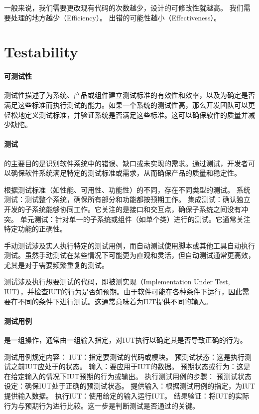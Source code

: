 一般来说，我们需要更改现有代码的次数越少，设计的可修改性就越高。
我们需要处理的地方越少（Efficiency）。
出错的可能性越小（Effectiveness）。

\section{Testability}
\paragraph{可测试性}测试性描述了为系统、产品或组件建立测试标准的有效性和效率，以及为确定是否满足这些标准而执行测试的能力。如果一个系统的测试性高，那么开发团队可以更轻松地定义测试标准，并验证系统是否满足这些标准。这可以确保软件的质量并减少缺陷。
\paragraph{测试}的主要目的是识别软件系统中的错误、缺口或未实现的需求。通过测试，开发者可以确保软件系统满足特定的测试标准或需求，从而确保产品的质量和稳定性。

根据测试标准（如性能、可用性、功能性）的不同，存在不同类型的测试。
系统测试：测试整个系统，确保所有部分和功能都按预期工作。
集成测试：确认独立开发的子系统能够协同工作。它关注的是接口和交互点，确保子系统之间没有冲突。
单元测试：针对单一的子系统或组件（如单个类）进行的测试。它通常关注特定功能的正确性。

手动测试涉及实人执行特定的测试用例，而自动测试使用脚本或其他工具自动执行测试。虽然手动测试在某些情况下可能更为直观和灵活，但自动测试通常更高效，尤其是对于需要频繁重复的测试。

测试涉及执行想要测试的代码，即被测实现（Implementation Under Test, IUT），并检查IUT的行为是否如预期。由于软件可能在各种条件下运行，因此需要在不同的条件下进行测试。这通常意味着为IUT提供不同的输入。

\paragraph{测试用例}是一组操作，通常由一组输入指定，对IUT执行以确定其是否导致正确的行为。

测试用例规定内容：
IUT：指定要测试的代码或模块。
预测试状态：这是执行测试之前IUT应处于的状态。
输入：要应用于IUT的数据。
预期状态或行为：这是在给定输入的情况下IUT预期的行为或输出。
执行测试用例的步骤：
预测试状态设定：确保IUT处于正确的预测试状态。
提供输入：根据测试用例的指定，为IUT提供输入数据。
执行IUT：使用给定的输入运行IUT。
结果验证：将IUT的实际行为与预期行为进行比较。这一步是判断测试是否通过的关键。

